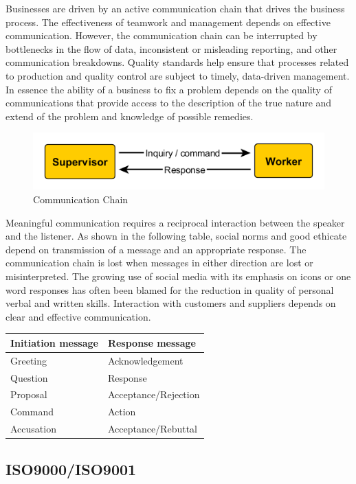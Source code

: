 \documentclass[]{book}
\begin{document}
Businesses are driven by an active communication chain that drives the business process. The effectiveness of teamwork and management depends on effective communication. However, the communication chain can be interrupted by bottlenecks in the flow of data, inconsistent or misleading reporting, and other communication breakdowns. Quality standards help ensure that processes related to production and quality control are subject to timely, data-driven management. In essence the ability of a business to fix a problem depends on the quality of communications that provide access to the description of the true nature and extend of the problem and knowledge of possible remedies.

\begin{figure}
\centering
\includegraphics{images/communication.png}
\caption{Communication Chain}
\end{figure}

Meaningful communication requires a reciprocal interaction between the speaker and the listener. As shown in the following table, social norms and good ethicate depend on transmission of a message and an appropriate response. The communication chain is lost when messages in either direction are lost or misinterpreted. The growing use of social media with its emphasis on icons or one word responses has often been blamed for the reduction in quality of personal verbal and written skills. Interaction with customers and suppliers depends on clear and effective communication.

\begin{longtable}[]{@{}ll@{}}
\toprule
Initiation message & Response message\tabularnewline
\midrule
\endhead
Greeting & Acknowledgement\tabularnewline
Question & Response\tabularnewline
Proposal & Acceptance/Rejection\tabularnewline
Command & Action\tabularnewline
Accusation & Acceptance/Rebuttal\tabularnewline
\bottomrule
\end{longtable}

\hypertarget{iso9000iso9001}{%
\subsection{ISO9000/ISO9001}\label{iso9000iso9001}}
\end{document}
